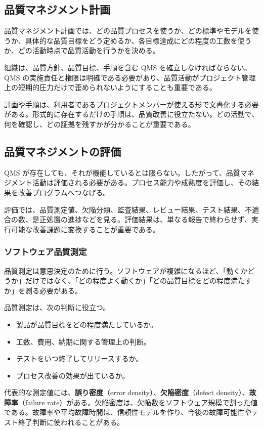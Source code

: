 \documentclass[11pt,a4paper]{article}
\newcommand{\term}[2]{\textbf{#1}（#2）}
\begin{document}
\subsection{品質マネジメント計画}
品質マネジメント計画では、どの品質プロセスを使うか、どの標準やモデルを使うか、具体的な品質目標をどう定めるか、各目標達成にどの程度の工数を使うか、どの活動時点で品質活動を行うかを決める。

組織は、品質方針、品質目標、手順を含む QMS を確立しなければならない。QMS の実施責任と権限は明確である必要があり、品質活動がプロジェクト管理上の短期的圧力だけで歪められないようにすることも重要である。

計画や手順は、利用者であるプロジェクトメンバーが使える形で文書化する必要がある。形式的に存在するだけの手順は、品質改善に役立たない。どの活動で、何を確認し、どの証拠を残すかが分かることが重要である。

\subsection{品質マネジメントの評価}
QMS が存在しても、それが機能しているとは限らない。したがって、品質マネジメント活動は評価される必要がある。プロセス能力や成熟度を評価し、その結果を改善プログラムへつなげる。

評価では、品質測定値、欠陥分類、監査結果、レビュー結果、テスト結果、不適合の数、是正処置の進捗などを見る。評価結果は、単なる報告で終わらせず、実行可能な改善課題に変換することが重要である。

\subsubsection{ソフトウェア品質測定}
品質測定は意思決定のために行う。ソフトウェアが複雑になるほど、「動くかどうか」だけではなく、「どの程度よく動くか」「どの品質目標をどの程度満たすか」を測る必要がある。

品質測定は、次の判断に役立つ。
\begin{itemize}
  \item 製品が品質目標をどの程度満たしているか。
  \item 工数、費用、納期に関する管理上の判断。
  \item テストをいつ終了してリリースするか。
  \item プロセス改善の効果が出ているか。
\end{itemize}

代表的な測定値には、\term{誤り密度}{error density}、\term{欠陥密度}{defect density}、\term{故障率}{failure rate}がある。欠陥密度は、欠陥数をソフトウェア規模で割った値である。故障率や平均故障時間は、信頼性モデルを作り、今後の故障可能性やテスト終了判断に使われることがある。
\end{document}
